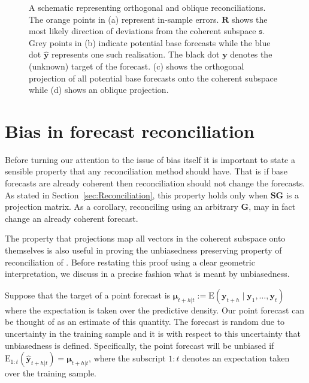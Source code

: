\documentclass[12pt]{article}
\def\E{\text{E}}
\theoremstyle{definition}
\begin{document}
\begin{figure}[!p]
\begin{subfigure}[!h]{0.415\textwidth}
      \caption{}
  \end{subfigure}
  \caption{A schematic representing orthogonal and oblique reconciliations. The orange points in (a) represent in-sample errors. $\bm{R}$ shows the most likely direction of deviations from the coherent subspace $\mathfrak{s}$. Grey points in (b) indicate potential base forecasts while the blue dot ${\hat{\bm y}}$ represents one such realisation. The black dot ${\bm y}$ denotes the (unknown) target of the forecast. (c) shows the orthogonal projection of all potential base forecasts onto the coherent subspace while (d) shows an oblique projection.} \label{fig:OthogonalVSOblique_projection}
\end{figure}

\section{Bias in forecast reconciliation}\label{sec:BiasInRecon}

Before turning our attention to the issue of bias itself it is important to state a sensible property that any reconciliation method should have. That is if base forecasts are already coherent then reconciliation should not change the forecasts. As stated in Section~\ref{sec:Reconciliation}, this property holds only when $\bm{S}\bm{G}$ is a projection matrix. As a corollary, reconciling using an arbitrary $\bm{G}$, may in fact change an already coherent forecast.

The property that projections map all vectors in the coherent subspace onto themselves is also useful in proving the unbiasedness preserving property of reconciliation of \citet{WicEtAl2019}. Before restating this proof using a clear geometric interpretation, we discuss in a precise fashion what is meant by unbiasedness.

Suppose that the target of a point forecast is $\bm{\mu}_{t+h|t}:=\E(\bm{y}_{t+h}\mid\bm{y}_{1},\dots,\bm{y}_{t})$ where the expectation is taken over the predictive density. Our point forecast can be thought of as an estimate of this quantity. The forecast is random due to uncertainty in the training sample and it is with respect to this uncertainty that unbiasedness is defined. Specifically, the point forecast will be unbiased if $\E_{1:t}(\hat{\bm{y}}_{t+h|t})=\bm{\mu}_{t+h|t}$, where the subscript $1:t$ denotes an expectation taken over the training sample.
\end{document}
